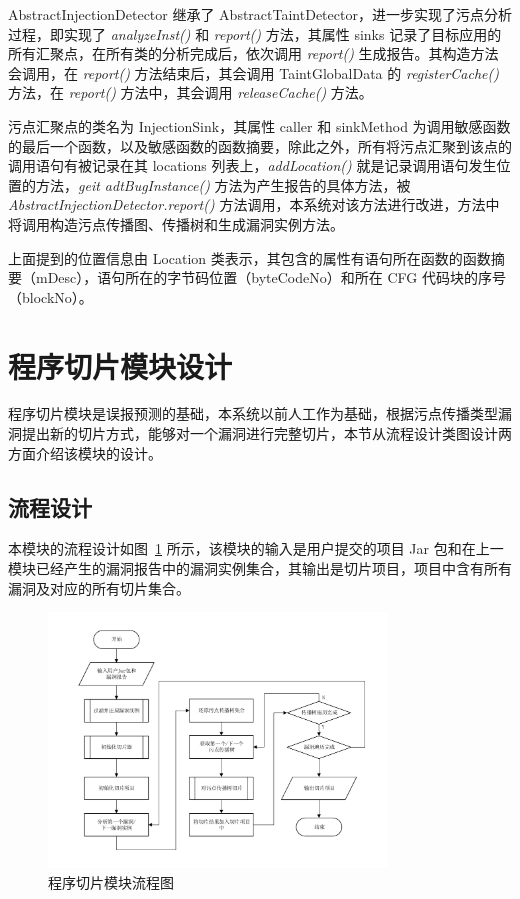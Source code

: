 AbstractInjectionDetector 继承了 AbstractTaintDetector，进一步实现了污点分析过程，即实现了 \textit{analyzeInst()} 和 \textit{report()} 方法，其属性 sinks 记录了目标应用的所有汇聚点，在所有类的分析完成后，依次调用 \textit{report()} 生成报告。其构造方法会调用，在 \textit{report()} 方法结束后，其会调用 TaintGlobalData 的 \textit{registerCache()} 方法，在 \textit{report()} 方法中，其会调用 \textit{releaseCache()} 方法。

污点汇聚点的类名为 InjectionSink，其属性 caller 和 sinkMethod 为调用敏感函数的最后一个函数，以及敏感函数的函数摘要，除此之外，所有将污点汇聚到该点的调用语句有被记录在其 locations 列表上，\textit{addLocation()} 就是记录调用语句发生位置的方法，\textit{geit adtBugInstance()} 方法为产生报告的具体方法，被 \textit{AbstractInjectionDetector.report()} 方法调用，本系统对该方法进行改进，方法中将调用构造污点传播图、传播树和生成漏洞实例方法。

上面提到的位置信息由 Location 类表示，其包含的属性有语句所在函数的函数摘要（mDesc），语句所在的字节码位置（byteCodeNo）和所在 CFG 代码块的序号（blockNo）。

\section{程序切片模块设计}

程序切片模块是误报预测的基础，本系统以前人工作为基础，根据污点传播类型漏洞提出新的切片方式，能够对一个漏洞进行完整切片，本节从流程设计类图设计两方面介绍该模块的设计。
\subsection{流程设计}

本模块的流程设计如图~\ref{sliceProcessing} 所示，该模块的输入是用户提交的项目 Jar 包和在上一模块已经产生的漏洞报告中的漏洞实例集合，其输出是切片项目，项目中含有所有漏洞及对应的所有切片集合。

\begin{figure}[!htb]
    \centering
    \includegraphics[width=0.8\textwidth]{FIGs/chapter3/sliceProcessing.pdf}
    \caption{程序切片模块流程图}\label{sliceProcessing}
\end{figure}

